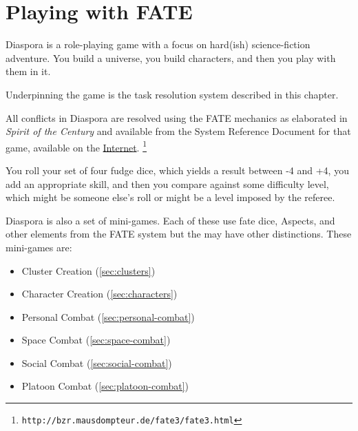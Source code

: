 \chapter{Playing with FATE}
\label{cha:playing-with-fate}

Diaspora is a role-playing game with a focus on hard(ish) science-fiction adventure. You build a universe, you build characters, and then you play with them in it.

Underpinning the game is the task resolution system described in this chapter.

All conflicts in Diaspora are resolved using the FATE mechanics as elaborated in \emph{Spirit of the Century} and available from the System Reference Document for that game, available on the \href{http://bzr.mausdompteur.de/fate3/fate3.html}{Internet}.%
\footnote{ \texttt{http://bzr.mausdompteur.de/fate3/fate3.html} }

You roll your set of four fudge dice, which yields a result between -4 and +4, you add an appropriate skill, and then you compare against some difficulty level, which might be someone else's roll or might be a level imposed by the referee.



Diaspora is also a set of mini-games. Each of these use fate dice, Aspects, and other elements from the FATE system but the may have other distinctions.  These mini-games are:

\newpage

\begin{itemize}
\item Cluster Creation (\autoref{sec:clusters})
\item Character Creation (\autoref{sec:characters})
\item Personal Combat (\autoref{sec:personal-combat})
\item Space Combat (\autoref{sec:space-combat})
\item Social Combat (\autoref{sec:social-combat})
\item Platoon Combat (\autoref{sec:platoon-combat})
\end{itemize}


% 








